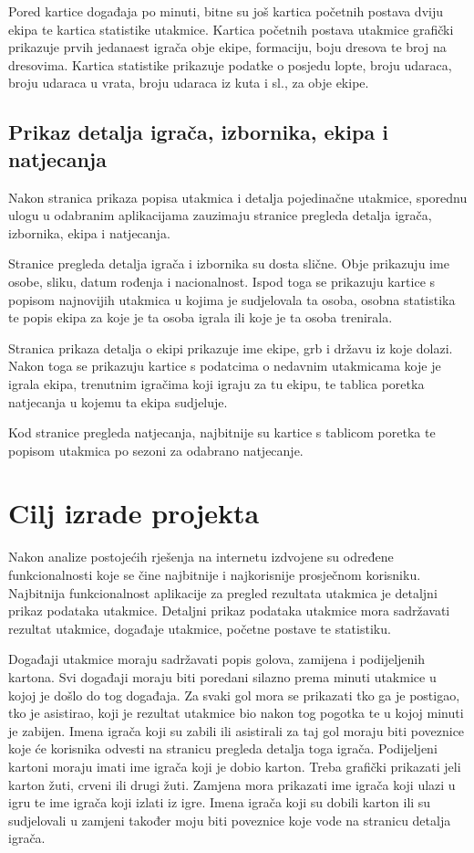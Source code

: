 \documentclass[times, utf8, zavrsni]{fer}
\begin{document}
Pored kartice događaja po minuti, bitne su još kartica početnih postava dviju ekipa te kartica statistike utakmice.
Kartica početnih postava utakmice grafički prikazuje prvih jedanaest igrača obje ekipe, formaciju, boju dresova te broj na dresovima.
Kartica statistike prikazuje podatke o posjedu lopte, broju udaraca, broju udaraca u vrata, broju udaraca iz kuta i sl., za obje ekipe.


\section{Prikaz detalja igrača, izbornika, ekipa i natjecanja}

Nakon stranica prikaza popisa utakmica i detalja pojedinačne utakmice, sporednu ulogu u odabranim aplikacijama zauzimaju stranice pregleda detalja igrača, izbornika, ekipa i natjecanja.

Stranice pregleda detalja igrača i izbornika su dosta slične. Obje prikazuju ime osobe, sliku, datum rođenja i nacionalnost.
Ispod toga se prikazuju kartice s popisom najnovijih utakmica u kojima je sudjelovala ta osoba, osobna statistika te popis ekipa za koje je ta osoba igrala ili koje je ta osoba trenirala.

Stranica prikaza detalja o ekipi prikazuje ime ekipe, grb i državu iz koje dolazi. Nakon toga se prikazuju kartice s podatcima o nedavnim utakmicama koje je igrala ekipa,
trenutnim igračima koji igraju za tu ekipu, te tablica poretka natjecanja u kojemu ta ekipa sudjeluje.

Kod stranice pregleda natjecanja, najbitnije su kartice s tablicom poretka te popisom utakmica po sezoni za odabrano natjecanje.

\chapter{Cilj izrade projekta}

Nakon analize postojećih rješenja na internetu izdvojene su određene funkcionalnosti koje se čine najbitnije i najkorisnije prosječnom korisniku.
Najbitnija funkcionalnost aplikacije za pregled rezultata utakmica je detaljni prikaz podataka utakmice.
Detaljni prikaz podataka utakmice mora sadržavati rezultat utakmice, događaje utakmice, početne postave te statistiku.

Događaji utakmice moraju sadržavati popis golova, zamijena i podijeljenih kartona. Svi događaji moraju biti poredani silazno prema minuti utakmice u kojoj je došlo do tog događaja.
Za svaki gol mora se prikazati tko ga je postigao, tko je asistirao, koji je rezultat utakmice bio nakon tog pogotka te u kojoj minuti je zabijen.
Imena igrača koji su zabili ili asistirali za taj gol moraju biti poveznice koje će korisnika odvesti na stranicu pregleda detalja toga igrača.
Podijeljeni kartoni moraju imati ime igrača koji je dobio karton. Treba grafički prikazati jeli karton žuti, crveni ili drugi žuti.
Zamjena mora prikazati ime igrača koji ulazi u igru te ime igrača koji izlati iz igre.
Imena igrača koji su dobili karton ili su sudjelovali u zamjeni također moju biti poveznice koje vode na stranicu detalja igrača.
\end{document}
